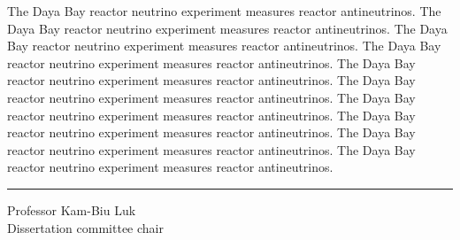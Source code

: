 \documentclass[11pt,oneside]{memoir}
\makeatletter
\def\MyDoubleSpacing{%
\setSpacing{2}%
}
\makeatother
\begin{document}
\normalsize
\MyDoubleSpacing
\noindent The Daya Bay reactor neutrino experiment measures reactor
antineutrinos. The Daya Bay reactor neutrino experiment measures reactor
antineutrinos. The Daya Bay reactor neutrino experiment measures reactor
antineutrinos. The Daya Bay reactor neutrino experiment measures reactor
antineutrinos. The Daya Bay reactor neutrino experiment measures reactor
antineutrinos. The Daya Bay reactor neutrino experiment measures reactor
antineutrinos. The Daya Bay reactor neutrino experiment measures reactor
antineutrinos. The Daya Bay reactor neutrino experiment measures reactor
antineutrinos. The Daya Bay reactor neutrino experiment measures reactor
antineutrinos. The Daya Bay reactor neutrino experiment measures reactor
antineutrinos. 

\SingleSpacing
\vspace{2.5\baselineskip}
\hfill
\begin{minipage}{0.4\textwidth}
  \hrule\vspace{0.4\baselineskip}
  Professor Kam-Biu Luk\\
  Dissertation committee chair
\end{minipage}

\frontmatter


\tableofcontents*{}

\mainmatter
\MyDoubleSpacing



\backmatter

\printbibliography
\end{document}
